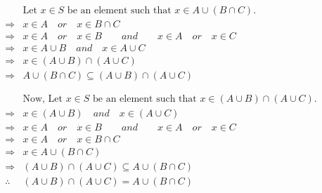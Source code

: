 \documentclass[]{article}
\begin{document}
\begin{align*}
	\begin{split}
		&\text{Let $x \in S$ be an element such that $x \in A\cup (B \cap C)$.}\\
		\Rightarrow& x \in A \quad or \quad x \in B \cap C\\
		\Rightarrow& x \in A \quad or \quad x \in B \qquad and \qquad x \in A \quad or \quad x \in C\\ 
		\Rightarrow& x \in A \cup B \quad and \quad x \in A \cup C\\
		\Rightarrow& x \in (A \cup B) \cap (A \cup C)\\
		\Rightarrow&  A\cup (B \cap C) \subseteq (A \cup B) \cap (A \cup C)\\
	\end{split}\\
	\begin{split}
		&\text{Now, Let $x \in S$ be an element such that $x \in (A \cup B) \cap (A \cup C)$.}\\
		\Rightarrow& x \in (A \cup B) \quad and \quad x \in (A \cup C)\\
		\Rightarrow& x \in A \quad or \quad x \in B \qquad and \qquad x \in A \quad or \quad x \in C\\ 
		\Rightarrow& x \in A \quad or \quad x \in B \cap C\\
		\Rightarrow& x \in A \cup (B \cap C)\\
		\Rightarrow& (A \cup B) \cap (A \cup C) \subseteq A\cup(B \cap C)\\
		\therefore& (A \cup B) \cap (A \cup C) = A\cup(B \cap C)
	\end{split}\\
\end{align*}
\end{document}
